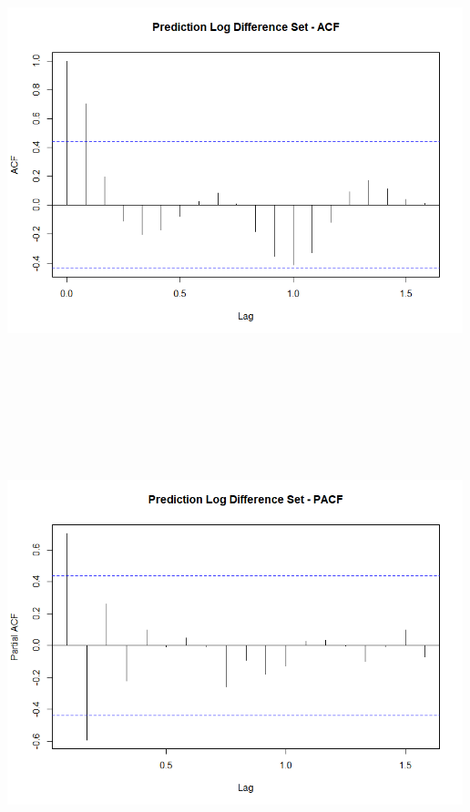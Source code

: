 \documentclass[
]{article}
\begin{document}
\includegraphics[width=5.20833in,height=5.20833in]{03_visuals/ld_pred_acf.png}

\includegraphics[width=5.20833in,height=5.20833in]{03_visuals/ld_pred_pacf.png}
\end{document}

